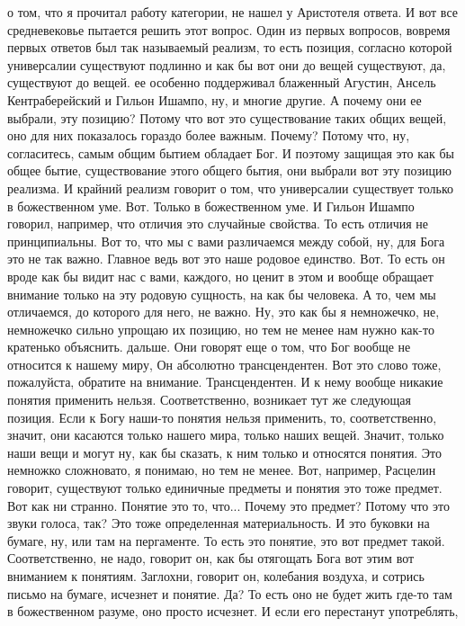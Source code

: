 о том, что я прочитал работу категории, не нашел у Аристотеля ответа. И вот все
средневековье пытается решить этот вопрос. Один из первых вопросов, вовремя
первых ответов был так называемый реализм, то есть позиция, согласно которой
универсалии существуют подлинно и как бы вот они до вещей существуют, да,
существуют до вещей. ее особенно поддерживал блаженный Агустин, Ансель
Кентраберейский и Гильон Ишампо, ну, и многие другие. А почему они ее выбрали,
эту позицию? Потому что вот это существование таких общих вещей, оно для них
показалось гораздо более важным. Почему? Потому что, ну, согласитесь, самым
общим бытием обладает Бог. И поэтому защищая это как бы общее бытие,
существование этого общего бытия, они выбрали вот эту позицию реализма. И
крайний реализм говорит о том, что универсалии существует только в божественном
уме. Вот. Только в божественном уме. И Гильон Ишампо говорил, например, что
отличия это случайные свойства. То есть отличия не принципиальны. Вот то, что мы
с вами различаемся между собой, ну, для Бога это не так важно. Главное ведь вот
это наше родовое единство. Вот. То есть он вроде как бы видит нас с вами,
каждого, но ценит в этом и вообще обращает внимание только на эту родовую
сущность, на как бы человека. А то, чем мы отличаемся, до которого для него, не
важно. Ну, это как бы я немножечко, не, немножечко сильно упрощаю их позицию, но
тем не менее нам нужно как-то кратенько объяснить. дальше. Они говорят еще о
том, что Бог вообще не относится к нашему миру, Он абсолютно трансцендентен. Вот
это слово тоже, пожалуйста, обратите на внимание. Трансцендентен. И к нему
вообще никакие понятия применить нельзя. Соответственно, возникает тут же
следующая позиция. Если к Богу наши-то понятия нельзя применить, то,
соответственно, значит, они касаются только нашего мира, только наших вещей.
Значит, только наши вещи и могут ну, как бы сказать, к ним только и относятся
понятия. Это немножко сложновато, я понимаю, но тем не менее. Вот, например,
Расцелин говорит, существуют только единичные предметы и понятия это тоже
предмет. Вот как ни странно. Понятие это то, что... Почему это предмет? Потому
что это звуки голоса, так? Это тоже определенная материальность. И это буковки
на бумаге, ну, или там на пергаменте. То есть это понятие, это вот предмет
такой. Соответственно, не надо, говорит он, как бы отягощать Бога вот этим вот
вниманием к понятиям. Заглохни, говорит он, колебания воздуха, и сотрись письмо
на бумаге, исчезнет и понятие. Да? То есть оно не будет жить где-то там в
божественном разуме, оно просто исчезнет. И если его перестанут употреблять,
